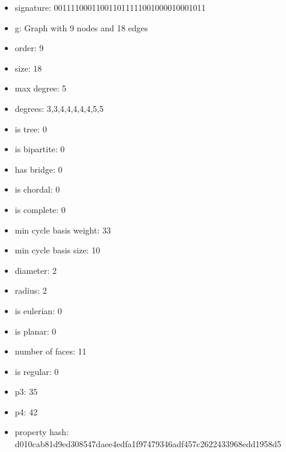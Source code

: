 \newpage
\begin{figure}
\end{figure}
\begin{itemize}
\item signature: 001111000110011011111001000010001011
\item g: Graph with 9 nodes and 18 edges
\item order: 9
\item size: 18
\item max degree: 5
\item degrees: 3,3,4,4,4,4,4,5,5
\item is tree: 0
\item is bipartite: 0
\item has bridge: 0
\item is chordal: 0
\item is complete: 0
\item min cycle basis weight: 33
\item min cycle basis size: 10
\item diameter: 2
\item radius: 2
\item is eulerian: 0
\item is planar: 0
\item number of faces: 11
\item is regular: 0
\item p3: 35
\item p4: 42
\item property hash: d010cab81d9ed308547daee4edfa1f97479346adf457c2622433968edd1958d5
\end{itemize}
